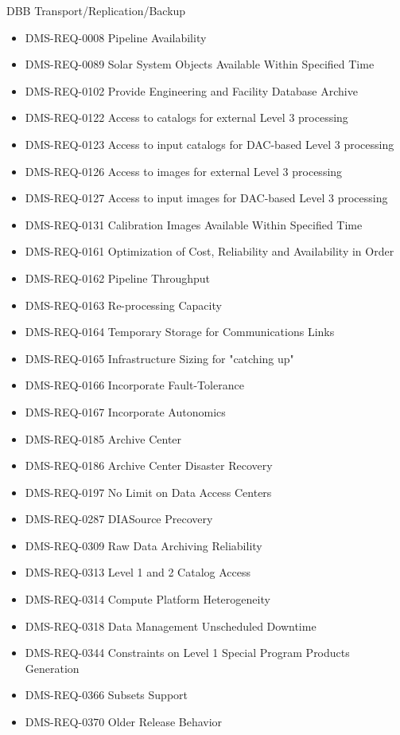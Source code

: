 DBB Transport/Replication/Backup \begin{itemize}
\item DMS-REQ-0008 Pipeline Availability
\item DMS-REQ-0089 Solar System Objects Available Within Specified Time
\item DMS-REQ-0102 Provide Engineering and Facility Database Archive
\item DMS-REQ-0122 Access to catalogs for external Level 3 processing
\item DMS-REQ-0123 Access to input catalogs for DAC-based Level 3 processing
\item DMS-REQ-0126 Access to images for external Level 3 processing
\item DMS-REQ-0127 Access to input images for DAC-based Level 3 processing
\item DMS-REQ-0131 Calibration Images Available Within Specified Time
\item DMS-REQ-0161 Optimization of Cost, Reliability and Availability in Order
\item DMS-REQ-0162 Pipeline Throughput
\item DMS-REQ-0163 Re-processing Capacity
\item DMS-REQ-0164 Temporary Storage for Communications Links
\item DMS-REQ-0165 Infrastructure Sizing for "catching up"
\item DMS-REQ-0166 Incorporate Fault-Tolerance
\item DMS-REQ-0167 Incorporate Autonomics
\item DMS-REQ-0185 Archive Center
\item DMS-REQ-0186 Archive Center Disaster Recovery
\item DMS-REQ-0197 No Limit on Data Access Centers
\item DMS-REQ-0287 DIASource Precovery
\item DMS-REQ-0309 Raw Data Archiving Reliability
\item DMS-REQ-0313 Level 1 and 2 Catalog Access
\item DMS-REQ-0314 Compute Platform Heterogeneity
\item DMS-REQ-0318 Data Management Unscheduled Downtime
\item DMS-REQ-0344 Constraints on Level 1 Special Program Products Generation
\item DMS-REQ-0366 Subsets Support
\item DMS-REQ-0370 Older Release Behavior
\end{itemize}
